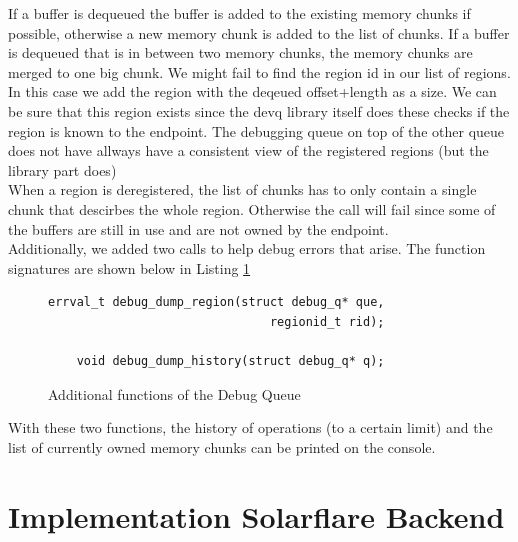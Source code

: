 \documentclass[a4paper,11pt,twoside]{report}
\begin{document}
If a buffer is dequeued the buffer is added to the existing memory           
chunks if possible, otherwise a new memory chunk is added to the             
list of chunks. If a buffer is dequeued that is in between two               
memory chunks, the memory chunks are merged to one big chunk.                
We might fail to find the region id in our list of regions. In this          
case we add the region with the deqeued offset+length as a size.             
We can be sure that this region exists since the devq library itself         
does these checks if the region is known to the endpoint. The debugging queue 
on top of the other queue does not have allways have a consistent view of the 
registered regions (but the \devif library part does)         
\\                                                                           
When a region is deregistered, the list of chunks has to only                
contain a single chunk that descirbes the whole region. Otherwise            
the call will fail since some of the buffers are still in use and are not
owned by the endpoint.   
\\
Additionally, we added two calls to help debug errors that arise. The function signatures
are shown below in Listing \ref{lst:debug}

\begin{figure}[h]
	\caption{Additional functions of the Debug Queue}
	\centering
	\begin{lstlisting}[style=code]
    errval_t debug_dump_region(struct debug_q* que,
                               regionid_t rid);     
                                          
    void debug_dump_history(struct debug_q* q);  
	\end{lstlisting}
	\label{lst:debug}
\end{figure} 
With these two functions, the history of operations (to a certain limit) 
and the list of currently owned memory chunks can be printed on the console.

\section{Implementation Solarflare Backend}
\end{document}
